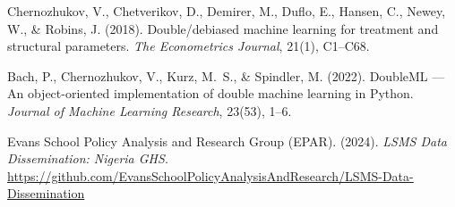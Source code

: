 \documentclass[11pt]{article}
\begin{document}
Chernozhukov, V., Chetverikov, D., Demirer, M., Duflo, E., Hansen, C.,
Newey, W., \& Robins, J. (2018). Double/debiased machine learning for
treatment and structural parameters.
\textit{The Econometrics Journal}, 21(1), C1--C68.

Bach, P., Chernozhukov, V., Kurz, M.\ S., \& Spindler, M. (2022).
DoubleML --- An object-oriented implementation of double machine learning
in Python. \textit{Journal of Machine Learning Research}, 23(53), 1--6.

Evans School Policy Analysis and Research Group (EPAR). (2024).
\textit{LSMS Data Dissemination: Nigeria GHS}.
\url{https://github.com/EvansSchoolPolicyAnalysisAndResearch/LSMS-Data-Dissemination}
\end{document}

